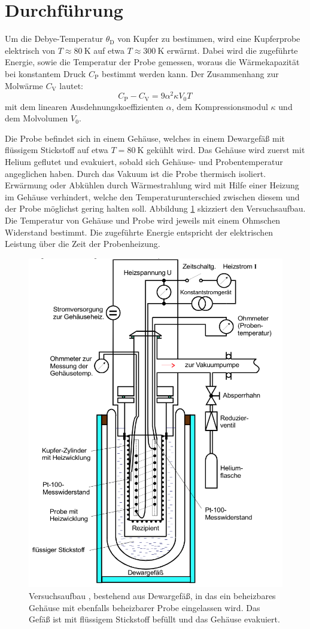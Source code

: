 \section{Durchführung}
\label{sec:durchführung}
Um die Debye-Temperatur $\theta_\text{D}$ von Kupfer zu bestimmen, wird
eine Kupferprobe elektrisch von $T \approx \SI{80}{\kelvin}$ auf etwa
$T \approx \SI{300}{\kelvin}$ erwärmt.
Dabei wird die zugeführte Energie, sowie die Temperatur der Probe gemessen,
woraus die Wärmekapazität bei konstantem Druck $C_\mathrm{P}$ bestimmt werden kann.
Der Zusammenhang zur Molwärme $C_\mathrm{V}$ lautet:
\begin{equation}
    \label{eqn:cp_cv}
    C_\mathrm{P} - C_\mathrm{V} = 9\alpha^2\kappa V_0 T\,
\end{equation}
mit dem linearen Ausdehnungskoeffizienten $\alpha$, dem Kompressionsmodul
$\kappa$ und dem Molvolumen $V_0$.

Die Probe befindet sich in einem Gehäuse, welches in einem Dewargefäß
mit flüssigem Stickstoff auf etwa $T=\SI{80}{\kelvin}$ gekühlt wird.
Das Gehäuse wird zuerst mit Helium geflutet und evakuiert, sobald sich
Gehäuse- und Probentemperatur angeglichen haben.
Durch das Vakuum ist die Probe thermisch isoliert.
Erwärmung oder Abkühlen durch Wärmestrahlung wird mit Hilfe einer Heizung
im Gehäuse verhindert, welche den Temperaturunterschied zwischen diesem und
der Probe möglichst gering halten soll.
Abbildung \ref{fig:aufbau} skizziert den Versuchsaufbau.
Die Temperatur von Gehäuse und Probe wird jeweils mit einem Ohmschen Widerstand
bestimmt.
Die zugeführte Energie entspricht der elektrischen Leistung über die Zeit
der Probenheizung.
\begin{figure}
    \centering
    \includegraphics[width=0.6\linewidth]{img/aufbau.png}
    \caption{
        Versuchsaufbau \cite{V47}, bestehend aus Dewargefäß, in das ein beheizbares
        Gehäuse mit ebenfalls beheizbarer Probe eingelassen wird.
        Das Gefäß ist mit flüssigem Stickstoff befüllt und das Gehäuse
        evakuiert.
    }
    \label{fig:aufbau}
\end{figure}
